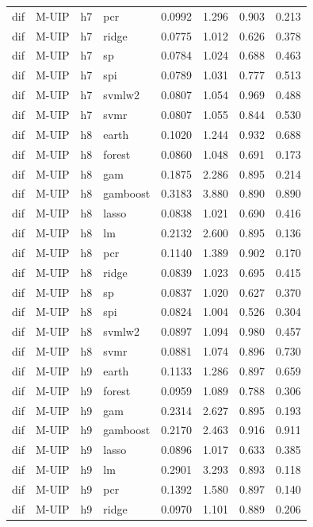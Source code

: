 \begin{ThreePartTable}
\begin{longtable}[t]{llclcccc}
dif & M-UIP & h7 & pcr & 0.0992 & 1.296 & 0.903 & 0.213\\
dif & M-UIP & h7 & ridge & 0.0775 & 1.012 & 0.626 & 0.378\\
dif & M-UIP & h7 & sp & 0.0784 & 1.024 & 0.688 & 0.463\\
dif & M-UIP & h7 & spi & 0.0789 & 1.031 & 0.777 & 0.513\\
dif & M-UIP & h7 & svmlw2 & 0.0807 & 1.054 & 0.969 & 0.488\\
dif & M-UIP & h7 & svmr & 0.0807 & 1.055 & 0.844 & 0.530\\
\addlinespace
dif & M-UIP & h8 & earth & 0.1020 & 1.244 & 0.932 & 0.688\\
dif & M-UIP & h8 & forest & 0.0860 & 1.048 & 0.691 & 0.173\\
dif & M-UIP & h8 & gam & 0.1875 & 2.286 & 0.895 & 0.214\\
dif & M-UIP & h8 & gamboost & 0.3183 & 3.880 & 0.890 & 0.890\\
dif & M-UIP & h8 & lasso & 0.0838 & 1.021 & 0.690 & 0.416\\
dif & M-UIP & h8 & lm & 0.2132 & 2.600 & 0.895 & 0.136\\
dif & M-UIP & h8 & pcr & 0.1140 & 1.389 & 0.902 & 0.170\\
dif & M-UIP & h8 & ridge & 0.0839 & 1.023 & 0.695 & 0.415\\
dif & M-UIP & h8 & sp & 0.0837 & 1.020 & 0.627 & 0.370\\
dif & M-UIP & h8 & spi & 0.0824 & 1.004 & 0.526 & 0.304\\
dif & M-UIP & h8 & svmlw2 & 0.0897 & 1.094 & 0.980 & 0.457\\
dif & M-UIP & h8 & svmr & 0.0881 & 1.074 & 0.896 & 0.730\\
\addlinespace
dif & M-UIP & h9 & earth & 0.1133 & 1.286 & 0.897 & 0.659\\
dif & M-UIP & h9 & forest & 0.0959 & 1.089 & 0.788 & 0.306\\
dif & M-UIP & h9 & gam & 0.2314 & 2.627 & 0.895 & 0.193\\
dif & M-UIP & h9 & gamboost & 0.2170 & 2.463 & 0.916 & 0.911\\
dif & M-UIP & h9 & lasso & 0.0896 & 1.017 & 0.633 & 0.385\\
dif & M-UIP & h9 & lm & 0.2901 & 3.293 & 0.893 & 0.118\\
dif & M-UIP & h9 & pcr & 0.1392 & 1.580 & 0.897 & 0.140\\
dif & M-UIP & h9 & ridge & 0.0970 & 1.101 & 0.889 & 0.206\\

\end{longtable}
\end{ThreePartTable}

